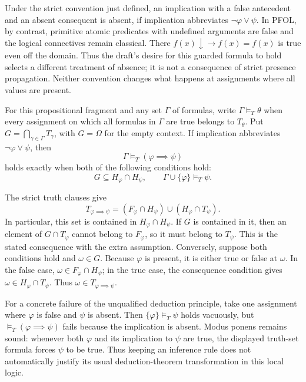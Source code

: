 \begin{note}
Under the strict convention just defined, an implication with a false
antecedent and an absent consequent is absent, if implication abbreviates
$\neg\varphi\lor\psi$. In PFOL, by contrast, primitive atomic predicates
with undefined arguments are false and the logical connectives remain
classical. There $f(x)\downarrow\to f(x)=f(x)$ is true even off the
domain. Thus the draft's desire for this guarded formula to hold selects
a different treatment of absence; it is not a consequence of strict
presence propagation. Neither convention changes what happens at
assignments where all values are present.
\end{note}
\begin{proposition}
For this propositional fragment and any set $\Gamma$ of formulas, write
$\Gamma\models_T\theta$ when
every assignment on which all formulas in $\Gamma$ are true belongs
to $T_\theta$. Put $G=\bigcap_{\gamma\in\Gamma}T_\gamma$, with
$G=\Omega$ for the empty context. If implication abbreviates
$\neg\varphi\lor\psi$, then
\[
\Gamma\models_T(\varphi\implies\psi)
\]
holds exactly when both of the following conditions hold:
\[
G\subseteq H_\varphi\cap H_\psi,
\qquad
\Gamma\cup\{\varphi\}\models_T\psi.
\]
\end{proposition}
\Proof
The strict truth clauses give
\[
T_{\varphi\implies\psi}
 =(F_\varphi\cap H_\psi)\cup(H_\varphi\cap T_\psi).
\]
In particular, this set is contained in $H_\varphi\cap H_\psi$.
If $G$ is contained in it, then an element of $G\cap T_\varphi$
cannot belong to $F_\varphi$, so it must belong to $T_\psi$.
This is the stated consequence with the extra assumption.
Conversely, suppose both conditions hold and $\omega\in G$.
Because $\varphi$ is present, it is either true or false at $\omega$. In the
false case, $\omega\in F_\varphi\cap H_\psi$; in the true case,
the consequence condition gives $\omega\in H_\varphi\cap T_\psi$.
Thus $\omega\in T_{\varphi\implies\psi}$.
\Done

For a concrete failure of the unqualified deduction principle, take one
assignment where $\varphi$ is false and $\psi$ is absent. Then
$\{\varphi\}\models_T\psi$ holds vacuously, but
$\models_T(\varphi\implies\psi)$ fails because the implication is
absent. Modus ponens remains sound: whenever both $\varphi$ and its
implication to $\psi$ are true, the displayed truth-set formula forces
$\psi$ to be true. Thus keeping an inference rule does not automatically
justify its usual deduction-theorem transformation in this local logic.

